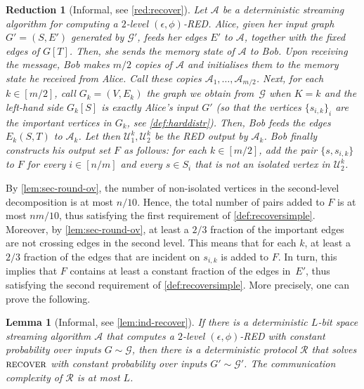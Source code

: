 \documentclass[epsfig,letter,11pt]{article}
\numberwithin{equation}{section}
\DeclareMathOperator*{\recover}{\textsc{recover}}
\newtheorem{lemma}[theorem]{Lemma}
\newtheorem*{reduct*}{Reduction}
\begin{document}
\begin{reduct*}[Informal, see \cref{red:recover}]
	Let $\mathcal{A}$ be a deterministic streaming algorithm for computing a $2$-level $(\epsilon,\phi)$-RED. Alice, given her input graph $G'=(S,E')$ generated by $\mathcal{G}'$, feeds her edges $E'$ to $\mathcal{A}$, together with the fixed edges of $G[T]$. Then, she sends the memory state of $\mathcal{A}$ to Bob. Upon receiving the message, Bob makes $m/2$ copies  of $\mathcal{A}$ and initialises them to the memory state he received from Alice. Call these copies $\mathcal{A}_1, \dots, \mathcal{A}_{m/2}$. Next, for each $k \in [m/2]$, call $G_k = (V,E_k)$ the graph we obtain from~$\mathcal{G}$ when $K=k$ and the left-hand side $G_k[S]$ is exactly Alice's input $G'$ (so that the vertices $\{s_{i,k}\}_i$ are the important vertices in $G_k$, see \cref{def:harddistr}). Then, Bob feeds the edges $E_k(S,T)$ to $\mathcal{A}_k$. Let then $\mathcal{U}^k_1,\mathcal{U}^k_2$ be the RED output by $\mathcal{A}_k$. Bob finally constructs his output set $F$ as follows: for each $k \in [m/2]$, add the pair $\{s,s_{i,k}\}$ to $F$ for every $i \in [n/m]$ and every $s \in S_i$ that is not an isolated vertex in $\mathcal{U}^k_2$.
\end{reduct*}
\noindent
By \cref{lem:sec-round-ov}, the number of non-isolated vertices in the second-level decomposition is at most $n/10$. Hence, the total number of pairs added to $F$ is at most $nm/10$, thus satisfying the first requirement of \cref{def:recoversimple}. Moreover, by \cref{lem:sec-round-ov}, at least a $2/3$ fraction of the important edges are not crossing edges in the second level. This means that for each $k$, at least a $2/3$ fraction of the edges that are incident on $s_{i,k}$ is added to $F$. In turn, this implies that $F$ contains at least a constant fraction of the edges in~$E'$, thus satisfying the second requirement of \cref{def:recoversimple}. More precisely, one can prove the following.

\begin{lemma}[Informal, see \cref{lem:ind-recover}]
	\label{lem:informalreduction}
	If there is a deterministic $L$-bit space streaming algorithm $\mathcal{A}$ that computes a $2$-level $(\epsilon,\phi)$-RED with constant probability over inputs $G \sim \mathcal{G}$, then there is a deterministic protocol $\mathcal{R}$ that solves $\recover$ with constant probability over inputs $G' \sim \mathcal{G}'$. The communication complexity of $\mathcal{R}$ is at most $L$.
\end{lemma}
\end{document}
